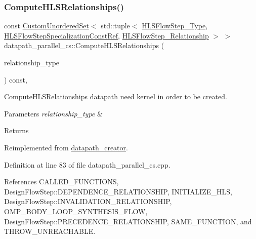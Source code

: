 \subsubsection{\texorpdfstring{Compute\+H\+L\+S\+Relationships()}{ComputeHLSRelationships()}}
{\footnotesize\ttfamily const \hyperlink{classCustomUnorderedSet}{Custom\+Unordered\+Set}$<$ std\+::tuple$<$ \hyperlink{hls__step_8hpp_ada16bc22905016180e26fc7e39537f8d}{H\+L\+S\+Flow\+Step\+\_\+\+Type}, \hyperlink{hls__step_8hpp_a5fdd2edf290c196531d21d68e13f0e74}{H\+L\+S\+Flow\+Step\+Specialization\+Const\+Ref}, \hyperlink{hls__step_8hpp_a3ad360b9b11e6bf0683d5562a0ceb169}{H\+L\+S\+Flow\+Step\+\_\+\+Relationship} $>$ $>$ datapath\+\_\+parallel\+\_\+cs\+::\+Compute\+H\+L\+S\+Relationships (\begin{DoxyParamCaption}\item[{const \hyperlink{classDesignFlowStep_a723a3baf19ff2ceb77bc13e099d0b1b7}{Design\+Flow\+Step\+::\+Relationship\+Type}}]{relationship\+\_\+type }\end{DoxyParamCaption}) const\hspace{0.3cm}{\ttfamily [protected]}, {\ttfamily [virtual]}}



Compute\+H\+L\+S\+Relationships datapath need kernel in order to be created. 


\begin{DoxyParams}{Parameters}
{\em relationship\+\_\+type} & \\
\hline
\end{DoxyParams}
\begin{DoxyReturn}{Returns}

\end{DoxyReturn}


Reimplemented from \hyperlink{classdatapath__creator_a7fb5e5ffd9ede6b14c718b9304a8f1dd}{datapath\+\_\+creator}.



Definition at line 83 of file datapath\+\_\+parallel\+\_\+cs.\+cpp.



References C\+A\+L\+L\+E\+D\+\_\+\+F\+U\+N\+C\+T\+I\+O\+NS, Design\+Flow\+Step\+::\+D\+E\+P\+E\+N\+D\+E\+N\+C\+E\+\_\+\+R\+E\+L\+A\+T\+I\+O\+N\+S\+H\+IP, I\+N\+I\+T\+I\+A\+L\+I\+Z\+E\+\_\+\+H\+LS, Design\+Flow\+Step\+::\+I\+N\+V\+A\+L\+I\+D\+A\+T\+I\+O\+N\+\_\+\+R\+E\+L\+A\+T\+I\+O\+N\+S\+H\+IP, O\+M\+P\+\_\+\+B\+O\+D\+Y\+\_\+\+L\+O\+O\+P\+\_\+\+S\+Y\+N\+T\+H\+E\+S\+I\+S\+\_\+\+F\+L\+OW, Design\+Flow\+Step\+::\+P\+R\+E\+C\+E\+D\+E\+N\+C\+E\+\_\+\+R\+E\+L\+A\+T\+I\+O\+N\+S\+H\+IP, S\+A\+M\+E\+\_\+\+F\+U\+N\+C\+T\+I\+ON, and T\+H\+R\+O\+W\+\_\+\+U\+N\+R\+E\+A\+C\+H\+A\+B\+LE.

